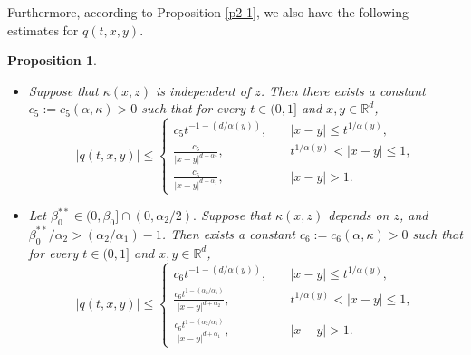 \documentclass[a4paper,11pt]{amsart}
\renewcommand{\le}{\leqslant}
\newcommand{\R}{\mathds R}
\newcommand{\B}{\beta}
\newcommand{\K}{\kappa}
\newcommand{\A}{\alpha}
\newtheorem{proposition}[theorem]{Proposition}
\theoremstyle{definition}
\begin{document}
Furthermore, according to Proposition \ref{p2-1}, we also have the following estimates for $q(t,x,y)$.
\begin{proposition}\label{P-new}\begin{itemize}
\item[(1)] Suppose that $\K(x,z)$ is independent of $z$. Then there exists a constant $c_5:=c_5(\A,\K)>0$ such that
for every $t \in (0,1]$ and $x,y\in \R^d$,
\begin{equation}\label{p3-1-2e}
|q(t,x,y)|\le
\begin{cases}
c_5t^{-1-({d}/{\A(y)})},\quad& |x-y|\le t^{{1}/{\A(y)}},\\
\frac{c_5}{|x-y|^{d+\A_2}},\quad& t^{{1}/{\A(y)}}< |x-y| \le 1,\\
\frac{c_5}{|x-y|^{d+\A_1}},\quad& |x-y|>1.
\end{cases}
\end{equation}

\item[(2)] Let $\B_0^{**}\in(0,\B_0]\cap(0,{\alpha_2}/{2}).$ Suppose that $\K(x,z)$ depends on $z$, and
$\B_0^{**}/{\A_2}>({\A_2}/{\A_1})-1$. Then exists a constant $c_6:=c_6(\A,\K)>0$ such that
for every $t \in (0,1]$ and $x,y\in\R^d$,
\begin{equation}\label{p3-1-2f}
|q(t,x,y)|\le
\begin{cases}
c_6t^{-1-({d}/{\A(y)})},\quad& |x-y|\le t^{{1}/{\A(y)}},\\
\frac{c_6t^{1-({\A_2}/{\A_1})}}{|x-y|^{d+\A_2}},\quad& t^{{1}/{\A(y)}}< |x-y| \le 1,\\
\frac{c_6t^{1-({\A_2}/{\A_1})}}{|x-y|^{d+\A_1}},\quad& |x-y|>1.
\end{cases}
\end{equation}
\end{itemize}
\end{proposition}
\end{document}
